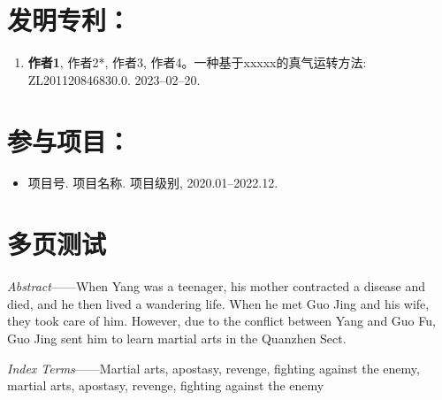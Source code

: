 \documentclass[print, doctor, vlined]{DissertUESTC}
\begin{document}
	\section*{发明专利：}
	

	\begin{enumerate}
		
		\item \textbf{作者1}, 作者2*, 作者3, 作者4。一种基于xxxxx的真气运转方法: ZL201120846830.0. 2023--02--20.
		
	\end{enumerate}
	
	\section*{参与项目：}
	
	\begin{itemize}
		\item 项目号. 项目名称. 项目级别, 2020.01--2022.12.
	\end{itemize}

	\newpage
	\section*{多页测试}



	\textit{Abstract}——When Yang was a teenager, his mother contracted a disease and died, and he then lived a wandering life. When he met Guo Jing and his wife, they took care of him. However, due to the conflict between Yang and Guo Fu, Guo Jing sent him to learn martial arts in the Quanzhen Sect.

	\textit{Index Terms}——Martial arts, apostasy, revenge, fighting against the enemy, martial arts, apostasy, revenge, fighting against the enemy

\end{document}
